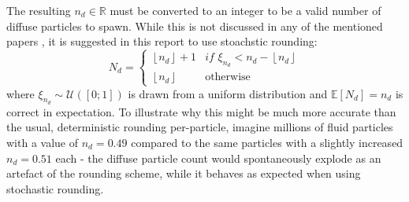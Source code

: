\documentclass[oneside, a4paper]{book}
\newcommand\br[1]{\left(#1\right)}
\begin{document}
  The resulting $n_d\in\mathds{R}$ must be converted to an integer to be a valid number of diffuse particles to spawn. While this is not discussed in any of the mentioned papers \autocites{spray-foam-bubbles}{turbulent-micropolar-foam}, it is suggested in this report to use stoachstic rounding:
  \begin{equation}\label{eq:foam-stochastic-rounding-nd}
    N_d = \begin{cases}
      \left\lfloor n_d\right\rfloor + 1 & \textit{if } \xi_{n_d} < n_d - \left\lfloor n_d\right\rfloor\\
      \left\lfloor n_d\right\rfloor & \text{otherwise}
    \end{cases}
  \end{equation}
  where $\xi_{n_d}\sim\mathcal{U}\br{[0;1]}$ is drawn from a uniform distribution and $\mathds{E}\left[N_d\right]=n_d$ is correct in expectation. To illustrate why this might be much more accurate than the usual, deterministic rounding per-particle, imagine millions of fluid particles with a value of $n_d=0.49$ compared to the same particles with a slightly increased $n_d=0.51$ each - the diffuse particle count would spontaneously explode as an artefact of the rounding scheme, while it behaves as expected when using stochastic rounding.
\end{document}
